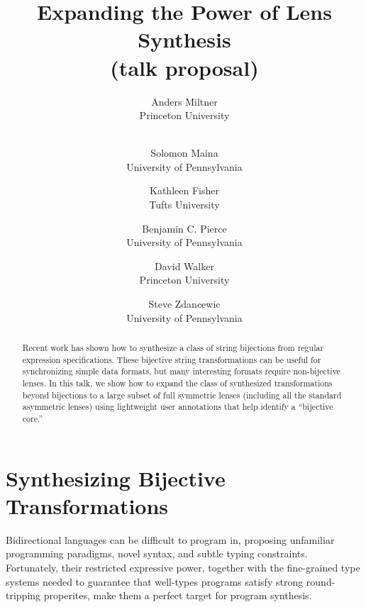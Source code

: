 \documentclass[a4paper]{article}
\title{Expanding the Power of Lens Synthesis \\ (talk proposal)}
\author{
Anders Miltner \\ Princeton University \\ \ 
\and
Solomon Maina \\ University of Pennsylvania
\and
Kathleen Fisher \\ Tufts University
\and
Benjamin C. Pierce \\ University of Pennsylvania
\and
David Walker \\ Princeton University
\and
Steve Zdancewic \\ University of Pennsylvania
}
\begin{document}
\maketitle



\begin{abstract}
Recent work has shown how to synthesize a class of string bijections from
regular expression specifications. These bijective string transformations
can be useful for synchronizing simple data formats, but many interesting
formats require non-bijective lenses. In this talk, we show how to expand
the class of synthesized transformations beyond bijections to a large subset
of full symmetric lenses (including all the standard asymmetric lenses)
using lightweight user annotations that help identify a ``bijective core.''
\end{abstract}


\section{Synthesizing Bijective Transformations}

Bidirectional languages can be difficult to program in, proposing unfamiliar
programming paradigms, novel syntax, and subtle typing constraints.
Fortunately, their restricted expressive power, together with the
fine-grained type systems needed to guarantee that well-types programs
satisfy strong round-tripping properites, make them a perfect target for
program synthesis.  
\end{document}
